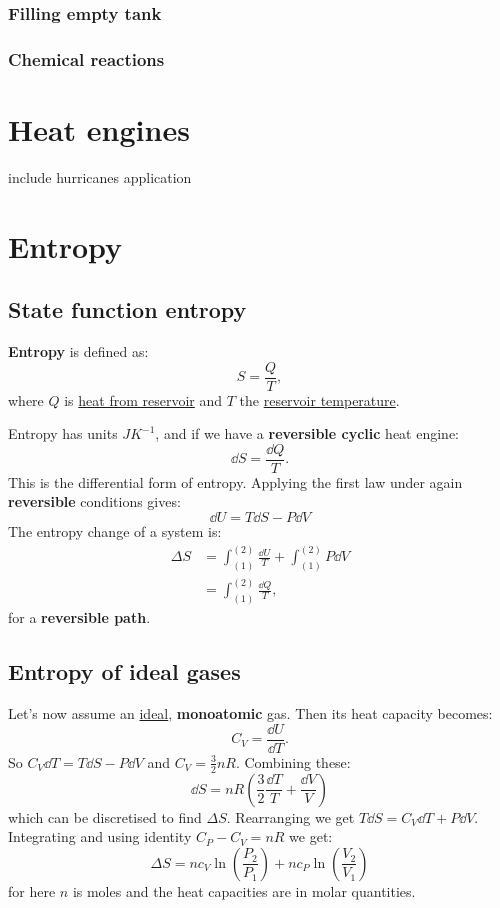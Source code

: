 \documentclass{article}
\begin{document}
\subsubsection{Filling empty tank}

\subsubsection{Chemical reactions}

\newpage

\section{Heat engines}
include hurricanes application

\newpage

\section{Entropy}

\subsection{State function entropy}
\textbf{Entropy} is defined as:
$$S=\frac{Q}{T},$$
where $Q$ is \underline{heat from reservoir} and $T$ the \underline{reservoir temperature}.

Entropy has units $JK^{-1}$, and if we have a \textbf{reversible cyclic} heat engine:
$$\dd S=\frac{\dd Q}{T}.$$
This is the differential form of entropy. Applying the first law under again \textbf{reversible} conditions gives:
$$\dd U=T\dd S-P \dd V$$
The entropy change of a system is:
\begin{align*}
    \Delta S
    &=\int_{(1)}^{(2)}\frac{\dd U}{T}+\int_{(1)}^{(2)}P\dd V \\
    &=\int_{(1)}^{(2)}\frac{\dd Q}{T},
\end{align*}
for a \textbf{reversible path}.

\subsection{Entropy of ideal gases}
Let's now assume an \underline{ideal}, \textbf{monoatomic} gas. Then its heat capacity becomes:
$$C_V=\frac{\dd U}{\dd T}.$$
So $C_V \dd T=T\dd S-P\dd V$ and $C_V=\frac{3}{2}nR$. Combining these:
$$\dd S=nR\left(\frac{3}{2}\frac{\dd T}{T}+\frac{\dd V}{V}\right)$$
which can be discretised to find $\Delta S$. Rearranging we get $T\dd S=C_V \dd T+P \dd V$. Integrating and using identity $C_P-C_V=nR$ we get:
$$\Delta S=nc_V\ln\left(\frac{P_2}{P_1}\right)+nc_P\ln\left(\frac{V_2}{V_1}\right)$$
for here $n$ is moles and the heat capacities are in molar quantities.
\end{document}
